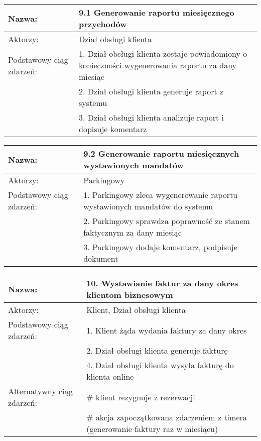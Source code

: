 \begin{center}
\vspace{1cm}

\begin{tabular}{|L{3cm}  L{13cm}|}
\hline
Nazwa: & 9.1 Generowanie raportu miesięcznego przychodów\\ \hline
Aktorzy: & Dział obsługi klienta \\ \hline
Podstawowy ciąg zdarzeń: & 1.  Dział obsługi klienta zostaje powiadomiony o konieczności wygenerowania raportu za dany miesiąc\\
 & 2. Dział obsługi klienta generuje raport z systemu\\
 & 3. Dział obsługi klienta analizuje raport i dopisuje komentarz \\
 \hline
\end{tabular}

\vspace{1cm}

\begin{tabular}{|L{3cm}  L{13cm}|}
\hline
Nazwa: & 9.2 Generowanie raportu miesięcznych wystawionych mandatów\\ \hline
Aktorzy: & Parkingowy \\ \hline
Podstawowy ciąg zdarzeń: & 1. Parkingowy zleca wygenerowanie raportu wystawionych mandatów do systemu\\
 & 2. Parkingowy sprawdza poprawność ze stanem faktycznym za dany miesiąc\\
 & 3. Parkingowy dodaje komentarz, podpisuje dokument\\
 \hline
\end{tabular}


\vspace{1cm}

\begin{tabular}{|L{3cm}  L{13cm}|}
\hline
Nazwa: & 10. Wystawianie faktur za dany okres klientom biznesowym \\ \hline
Aktorzy: & Klient,  Dział obsługi klienta \\ \hline
Podstawowy ciąg zdarzeń: & 1. Klient żąda wydania faktury za dany okres \\
 & 2. Dział obsługi klienta generuje fakturę \\
 & 4. Dział obsługi klienta wysyła fakturę do klienta online \\ \hline
Alternatywny ciąg zdarzeń:  & \# klient rezygnuje z rezerwacji \\
 & \# akcja zapoczątkowana zdarzeniem z timera (generowanie faktury raz w miesiącu) \\ \hline
\end{tabular}


\end{center}
